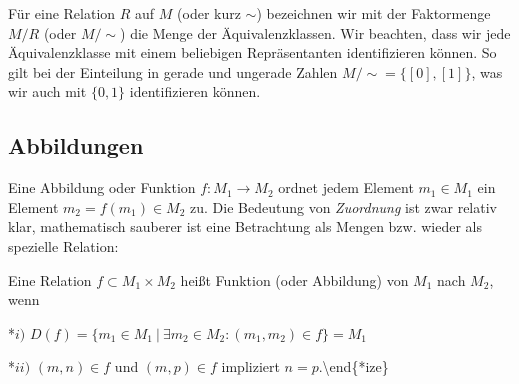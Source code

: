 \documentclass[letterpaper,10pt,english]{jupyterBook}
\begin{document}
Für eine Relation \(R\) auf \(M\) (oder kurz \(\sim\)) bezeichnen wir mit der Faktormenge \(M/R\) (oder \(M/\sim\)) die Menge der Äquivalenzklassen. Wir beachten, dass wir jede Äquivalenzklasse mit einem beliebigen Repräsentanten identifizieren können. So gilt bei der Einteilung in gerade und ungerade Zahlen \(M/\sim = \{[0],[1]\}\), was wir auch mit \(\{0,1\}\) identifizieren können.


\subsection{Abbildungen}
\label{\detokenize{grundlagen/mengenlogik:abbildungen}}
Eine Abbildung oder Funktion \(f:M_1 \rightarrow M_2\) ordnet jedem Element \(m_1 \in M_1\) ein Element \(m_2 =f(m_1) \in M_2\) zu.
Die Bedeutung von \emph{Zuordnung} ist zwar relativ klar, mathematisch sauberer  ist eine Betrachtung als Mengen bzw. wieder als spezielle Relation:
\label{grundlagen/mengenlogik:definition-10}
\begin{definition}{}{}



Eine Relation \(f \subset M_1 \times M_2\) heißt Funktion (oder Abbildung) von \(M_1\) nach \(M_2\), wenn

*\(i)\) \(D(f) = \{m_1 \in M_1~|~\exists m_2 \in M_2: (m_1,m_2) \in f \} = M_1 \)

*\(ii)\) \((m,n) \in f\) und \((m,p) \in f\) impliziert \(n=p\).\textbackslash{}end\{*ize\}
\end{definition}
\end{document}
